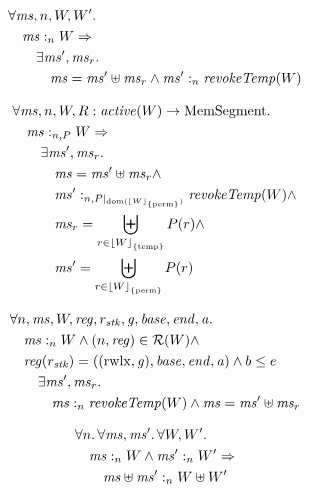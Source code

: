 \documentclass[a4paper]{article}
\DeclarePairedDelimiter\floor{\lfloor}{\rfloor}
\newcommand{\fun}{\rightarrow}
\DeclareMathOperator{\dom}{dom}
\newcommand{\var}[1]{\mathit{#1}}
\newcommand{\hs}{\var{ms}}
\newcommand{\ms}{\hs}
\newcommand{\gl}{\var{g}}
\newcommand{\addr}{\var{a}}
\newcommand{\start}{\var{base}}
\newcommand{\addrend}{\var{end}}
\newcommand{\reg}{\var{reg}}
\newcommand{\heap}{\var{mem}}
\newcommand{\stk}{\var{stk}}
\newcommand{\plainfun}[2]{
  \ifthenelse{\equal{#2}{}}
  {\mathit{#1}}
  {\mathit{#1}(#2)}
}
\newcommand{\revokeTemp}[1]{\plainfun{revokeTemp}{#1}}
\newcommand{\erase}[2]{\floor*{#1}_{\{#2\}}}
\newcommand{\activeReg}[1]{\plainfun{active}{#1}}
\newcommand{\heapSat}[3][\heap]{#1 :_{#2} #3}
\newcommand{\memSat}[3][n]{\heapSat[#2]{#1}{#3}}
\newcommand{\memSatPar}[4][n]{\heapSat[#2]{#1 , #4}{#3}}
\newcommand{\asmType}{\plaindom{AsmType}}
\newcommand{\plaindom}[1]{\mathrm{#1}}
\newcommand{\HeapSegments}{\plaindom{MemSegment}}
\newcommand{\MemSegments}{\HeapSegments}
\newcommand{\intr}[2]{\mathcal{#1}}
\newcommand{\regintr}[1]{\intr{R}{#1}}
\newcommand{\stdrr}{\regintr{\asmType}}
\newcommand{\npair}[2][n]{\left(#1,#2 \right)}
\newcommand{\plainperm}[1]{\mathrm{#1}}
\newcommand{\rwlx}{\plainperm{rwlx}}
\newcommand{\plainview}[1]{\mathrm{#1}}
\newcommand{\perma}{\plainview{perm}}
\newcommand{\temp}{\plainview{temp}}
\begin{document}
\begin{lemma}
\begin{lemma}
  \label{lem:priv-mono-like}
  \begin{align*}
    &      \forall \hs, n, W, W' \ldotp \\
    & \quad  \heapSat[\hs]{n}{W} \Rightarrow\\
    & \qquad \exists \hs', \hs_r \ldotp \\
    & \qquad \quad \hs = \hs' \uplus \hs_r \land \heapSat[\hs']{n}{\wrev{W}}
  \end{align*}
\end{lemma}

\begin{lemma}
  \label{lem:priv-mono-like2}
  \begin{align*}
    & \forall \ms, n, W, R : \activeReg{W} \fun \MemSegments  \ldotp \\
    & \quad \memSatPar{\ms}{W}{P} \Rightarrow \\
    & \qquad \exists \ms', \ms_r\ldotp \\
    & \qquad \quad \ms = \ms' \uplus \ms_r \land \\
    & \qquad \quad \memSatPar{\ms'}{\wrev{W}}{P|_{\dom(\erase{W}{\perma})}} \land \\
    & \qquad \quad \ms_r = \biguplus_{r \in \erase{W}{\temp}} P(r) \land \\
    & \qquad \quad \ms' = \biguplus_{r \in \erase{W}{\perma}} P(r)
  \end{align*}
\end{lemma}

\begin{lemma}
  \label{lem:revoke-temp-stack}
  \begin{align*}
    & \forall n, \ms, W, \reg, r_\stk,\gl,\start,\addrend,\addr \ldotp\\
    & \quad \memSat{\ms}{W} \land \npair{\reg} \in \stdrr(W) \land \\
    & \quad \reg(r_\stk) = ((\rwlx,\gl),\start,\addrend,\addr) \land b \leq e \\
    & \qquad \exists \ms', \ms_r \ldotp \\
    & \qquad \quad \memSat{\ms }{\revokeTemp{W}} \land \ms = \ms' \uplus \ms_r
  \end{align*}
\end{lemma}

\begin{lemma}
  \label{lem:disj-mem-sat}
  \begin{align*}
    & \forall n \ldotp \forall \ms, \ms' \ldotp \forall W, W' \ldotp\\
    & \quad \memSat{\ms}{W} \land \memSat{\ms'}{W'} \Rightarrow \\
    & \qquad \heapSat[\ms \uplus \ms' ]{n}{W \uplus W'}
  \end{align*}
\end{lemma}


\end{lemma}
\end{document}
